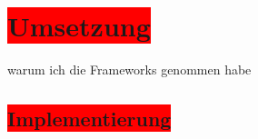 
\section{\colorbox{red}{Umsetzung}}

warum ich die Frameworks genommen habe
\subsection{\colorbox{red}{Implementierung}}



